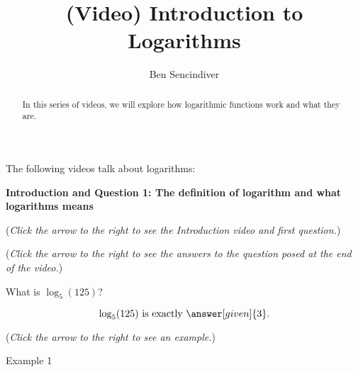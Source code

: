 \documentclass{ximera}
\title[Prerequisite Videos:]{(Video) Introduction to Logarithms}
\author{Ben Sencindiver}
\begin{document}
\begin{abstract}
  In this series of videos, we will explore how logarithmic functions
  work and what they are.
\end{abstract}
\maketitle

The following videos talk about logarithms: 

\textbf{Introduction and Question 1: The definition of logarithm and what
logarithms means}
\begin{question}
\begin{flushright}
{\color{blue}(\emph{Click the arrow to the right to see the Introduction video and first question.})}
\end{flushright}
\begin{center}
\begin{expandable}
{\color{blue}(\emph{Click the arrow to the right to see the answers 
to the question posed at the end of the video.})}
\begin{expandable}
What is $\log_5(125)$?
\begin{prompt}
\[
\log_5(125) \text{ is exactly }\answer[given]{3}.
\]
\end{prompt}
\begin{flushright}
{\color{blue}(\emph{Click the arrow to the right to see an example.})}
\end{flushright}
\begin{expandable}
Example 1
\end{expandable}
\end{expandable}
\end{expandable}
\end{center}
\end{question}
\end{document}
